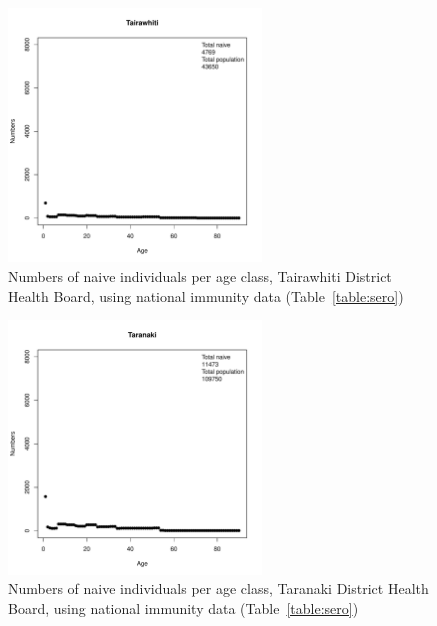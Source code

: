 \documentclass{article}
\begin{document}
\begin{figure}[H]
     \begin{center}
     \includegraphics[width=0.6\textwidth]{dhb8.pdf}
     \end{center}
     \caption{Numbers of naive individuals per age class, Tairawhiti District Health Board, using national immunity data (Table~\ref{table:sero})}
     \label{fig:Tairawhiti}
\end{figure}

\begin{figure}[H]
  \begin{center}
    \includegraphics[width=0.6\textwidth]{dhb9.pdf}
     \end{center}
     \caption{Numbers of naive individuals per age class, Taranaki District Health Board, using national immunity data (Table~\ref{table:sero})}
     \label{fig:Taranaki}
\end{figure}
\end{document}
